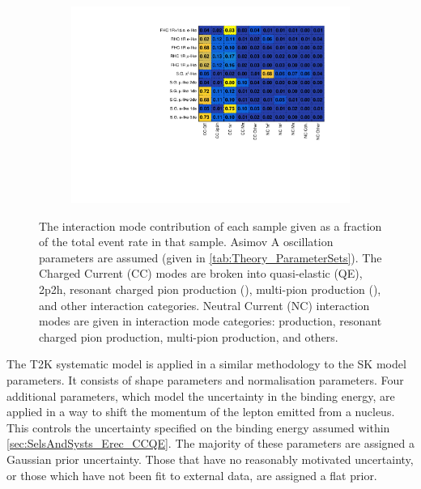 \begin{figure}[h]
  \begin{subfigure}[t]{\textwidth}
    \includegraphics[width=\textwidth, trim={0mm 0mm 0mm 0mm}, clip,page=1]{Figures/Selections/FractionalModeComparison.pdf}
  \end{subfigure}
  \caption{The interaction mode contribution of each sample given as a fraction of the total event rate in that sample. Asimov A oscillation parameters are assumed (given in \autoref{tab:Theory_ParameterSets}). The Charged Current (CC) modes are broken into quasi-elastic (QE), 2p2h, resonant charged pion production (\quickmath{1\pi^{\pm}}), multi-pion production (), and other interaction categories. Neutral Current (NC) interaction modes are given in interaction mode categories:  production, resonant charged pion production,  multi-pion production, and others.}
  \label{fig:SelsAndSysts_FractionalModeComparison}
\end{figure}

The T2K systematic model \cite{t2k_tn_344} is applied in a similar methodology to the SK model parameters. It consists of  shape parameters and  normalisation parameters. Four additional parameters, which model the uncertainty in the binding energy, are applied in a way to shift the momentum of the lepton emitted from a nucleus. This controls the uncertainty specified on the  binding energy assumed within \autoref{sec:SelsAndSysts_Erec_CCQE}. The majority of these parameters are assigned a Gaussian prior uncertainty. Those that have no reasonably motivated uncertainty, or those which have not been fit to external data, are assigned a flat prior.

